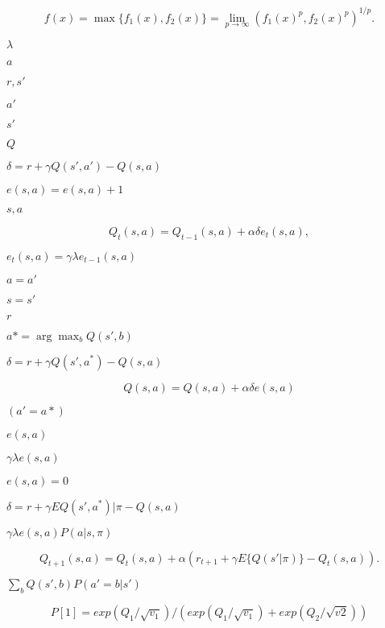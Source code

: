\documentclass{article}
\begin{document}
\[ f(x) = \max \{f_1(x), f_2(x)\} = \lim_{p \rightarrow \infty} (f_1(x)^p, f_2(x)^p)^{1/p}. \]
\pagebreak

$\lambda$
\pagebreak

$a$
\pagebreak

$r, s'$
\pagebreak

$a'$
\pagebreak

$s'$
\pagebreak

$Q$
\pagebreak

$\delta = r + \gamma Q(s',a') - Q(s,a)$
\pagebreak

$e(s,a) = e(s,a)+ 1$
\pagebreak

$s,a$
\pagebreak

\[ Q_{t}(s,a) = Q_{t-1}(s,a) + \alpha \delta e_{t}(s,a), \]
\pagebreak

$e_{t}(s,a) = \gamma \lambda e_{t-1}(s,a)$
\pagebreak

$a = a'$
\pagebreak

$s = s'$
\pagebreak

$r$
\pagebreak

$a* = \arg \max_b Q(s',b)$
\pagebreak

$\delta = r + \gamma Q(s',a^*) - Q(s,a)$
\pagebreak

\[ Q(s,a) = Q(s,a)+\alpha \delta e(s,a) \]
\pagebreak

$(a'=a*)$
\pagebreak

$e(s,a)$
\pagebreak

$\gamma \lambda e(s,a)$
\pagebreak

$e(s,a) = 0$
\pagebreak

$\delta = r + \gamma E{Q(s',a^*)|\pi} - Q(s,a)$
\pagebreak

$\gamma \lambda e(s,a) P(a|s,\pi) $
\pagebreak

\[ Q_{t+1}(s,a) = Q_{t}(s,a) + \alpha (r_{t+1} + \gamma E\{Q(s'|\pi)\} - Q_{t}(s,a)). \]
\pagebreak

$\sum_{b} Q(s',b) P(a'=b|s')$
\pagebreak

\[ P[1]=exp(Q_1/\sqrt{v_1})/(exp(Q_1/\sqrt{v_1})+exp(Q_2/\sqrt{v2})) \]
\pagebreak
\end{document}
